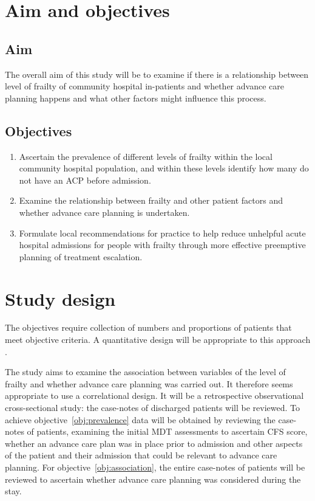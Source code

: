 \documentclass
[
	12pt,
	a4paper,
	oneside,
]{article}
\begin{document}
\section{Aim and objectives}

\subsection{Aim}
The overall aim of this study will be to examine if there is a relationship between
level of frailty of community hospital in-patients and whether advance care planning
happens and what other factors might influence this process.

\subsection{Objectives}

\begin{enumerate}
\item	Ascertain the prevalence of different levels of frailty within the local community
		hospital population, and within these levels identify how many do not have
		an ACP before admission.\label{obj:prevalence}
\item	Examine the relationship between frailty and other patient factors and
		whether advance care planning is undertaken.\label{obj:association}
\item	Formulate local recommendations for practice to help reduce unhelpful
		acute hospital admissions for people with frailty through more effective
		preemptive planning of treatment escalation.
\end{enumerate}

\section{Study design} 
\label{sec:design}
The objectives require collection of numbers
and proportions of patients that meet objective criteria. A quantitative design
will be appropriate to this approach \parencite{parahoo:14}.

The study aims to examine the association between variables of 
the level of frailty and whether advance care planning
was carried out. It therefore seems appropriate to use a correlational design. 
It will be a retrospective observational 
cross-sectional study: the case-notes of discharged patients will be reviewed. To achieve 
objective~\ref{obj:prevalence}
data will be obtained by reviewing the case-notes
of patients, examining the initial MDT assessments to ascertain CFS score, 
whether an advance care plan was in place prior to admission and other aspects
of the patient and their admission that could be relevant to advance care
planning. For objective~\ref{obj:association}, the entire case-notes of patients 
will be reviewed to ascertain whether advance care planning 
was considered during the stay. 
\end{document}
